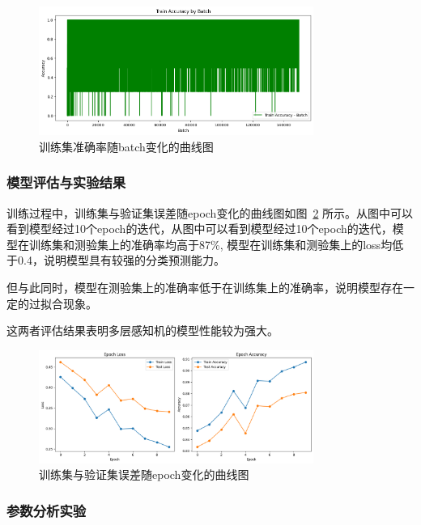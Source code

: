 \documentclass[12pt]{article}
\begin{document}
\begin{figure}[htbp]
  \centering
  \includegraphics[width=0.8\textwidth]{1_2.png}
  \caption[训练集准确率随batch变化的曲线图]{训练集准确率随batch变化的曲线图}
  \label{1_2}
\end{figure}

\subsubsection{模型评估与实验结果}
训练过程中，训练集与验证集误差随epoch变化的曲线图如图~\ref{1_3} 所示。从图中可以看到模型经过10个epoch的迭代，从图中可以看到模型经过10个epoch的迭代，模型在训练集和测验集上的准确率均高于87\%,
模型在训练集和测验集上的loss均低于0.4，说明模型具有较强的分类预测能力。

但与此同时，模型在测验集上的准确率低于在训练集上的准确率，说明模型存在一定的过拟合现象。

这两者评估结果表明多层感知机的模型性能较为强大。

\begin{figure}[htbp]
  \centering
  \includegraphics[width=0.8\textwidth]{1_3.png}
  \caption[训练集与验证集误差随epoch变化的曲线图]{训练集与验证集误差随epoch变化的曲线图}
  \label{1_3}
\end{figure}


\subsubsection{参数分析实验}
\end{document}
